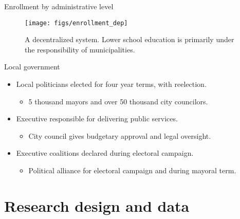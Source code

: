 \documentclass[ignorenonframetext,]{beamer}
\providecommand{\tightlist}{%
  \setlength{\itemsep}{0pt}\setlength{\parskip}{0pt}}
\begin{document}
\begin{frame}{Enrollment by administrative level}
\protect\hypertarget{enrollment-by-administrative-level}{}

\begin{figure}

{\centering \texttt{[image: figs/enrollment\_dep]} 

}

\caption{A decentralized system. Lower school education is primarily under the responsibility of municipalities.}\label{fig:unnamed-chunk-4}
\end{figure}

\end{frame}

\begin{frame}{Local government}
\protect\hypertarget{local-government}{}

\begin{itemize}
\tightlist
\item
  Local politicians elected for four year terms, with reelection.

  \begin{itemize}
  \tightlist
  \item
    5 thousand mayors and over 50 thousand city councilors.
  \end{itemize}
\item
  Executive responsible for delivering public services.

  \begin{itemize}
  \tightlist
  \item
    City council gives budgetary approval and legal oversight.
  \end{itemize}
\item
  Executive coalitions declared during electoral campaign.

  \begin{itemize}
  \tightlist
  \item
    Political alliance for electoral campaign and during mayoral term.
  \end{itemize}
\end{itemize}

\end{frame}

\hypertarget{research-design-and-data}{%
\section{Research design and data}\label{research-design-and-data}}
\end{document}
